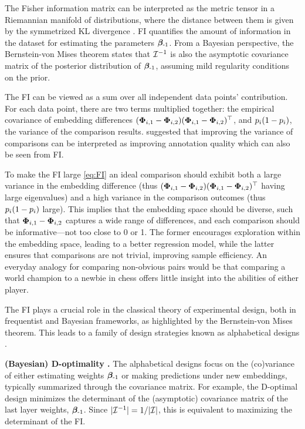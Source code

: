 The Fisher information matrix can be interpreted as the metric tensor in a Riemannian manifold of distributions, where the distance between them is given by the symmetrized KL divergence \citep{costa2015fisher}. FI quantifies the amount of information in the dataset for estimating the parameters $\bm{\beta}_{\text{-1}}$. From a Bayesian perspective, the Bernstein-von Mises theorem \citep[][Ch. 10.2, Thm 10.1]{van2000asymptotic} states that $\mathcal{I}^{-1}$ is also the asymptotic covariance matrix of the posterior distribution of $\bm{\beta}_{\text{-1}}$, assuming mild regularity conditions on the prior.

The FI can be viewed as a sum over all independent data points' contribution. For each data point, there are two terms multiplied together: the empirical covariance of embedding differences $(\bm{\Phi}_{i,1} - \bm{\Phi}_{i,2})(\bm{\Phi}_{i,1} - \bm{\Phi}_{i,2})^\top$, and $p_{i}(1 - p_{i})$, the variance of the comparison results. \citet{sun2024rethinking} suggested that improving the variance of comparisons can be interpreted as improving annotation quality which can also be seen from FI. 

To make the FI large \cref{eq:FI} an ideal comparison should exhibit both a large variance in the embedding difference (thus $(\bm{\Phi}_{i,1} - \bm{\Phi}_{i,2})(\bm{\Phi}_{i,1} - \bm{\Phi}_{i,2})^\top$ having large eigenvalues) and a high variance in the comparison outcomes (thus $p_{i}(1 - p_{i})$ large). This implies that the embedding space should be diverse, such that $\bm{\Phi}_{i,1} - \bm{\Phi}_{i,2}$ captures a wide range of differences, and each comparison should be informative—not too close to 0 or 1. The former encourages exploration within the embedding space, leading to a better regression model, while the latter ensures that comparisons are not trivial, improving sample efficiency. An everyday analogy for comparing non-obvious pairs would be that comparing a world champion to a newbie in chess offers little insight into the abilities of either player.

The FI plays a crucial role in the classical theory of experimental design, both in frequentist and Bayesian frameworks, as highlighted by the Bernstein-von Mises theorem. This leads to a family of design strategies known as alphabetical designs \citep{chaloner1995bayesian, pukelsheim2006optimal}. 

\textbf{(Bayesian) D-optimality \citep{chaloner1995bayesian}.}
The alphabetical designs focus on the (co)variance of either estimating weights $\bm{\beta}_{\text{-1}}$ or making predictions under new embeddings, typically summarized through the covariance matrix. For example, the D-optimal design minimizes the determinant of the (asymptotic) covariance matrix of the last layer weights, $\bm{\beta}_{\text{-1}}$. Since $|\mathcal{I}^{-1}| = 1 / |\mathcal{I}|$, this is equivalent to maximizing the determinant of the FI.

